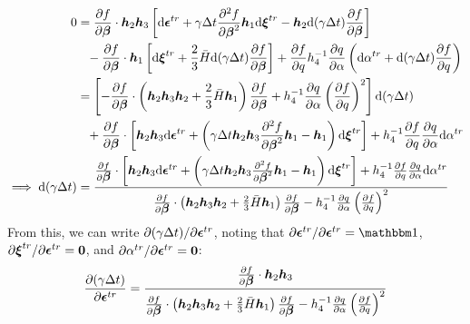 \documentclass[10pt]{article}
\begin{document}
\begin{equation}
\begin{aligned}
0 &=
\frac{\partial f}{\partial \mbox{\boldmath$\beta$}}\cdot
\mbox{\boldmath$ h$}_2
\mbox{\boldmath$ h$}_3
\left[
 \mathrm{d}\mbox{\boldmath$\epsilon$}^{tr}
 +\gamma\Delta t
\frac{\partial^2 f}{\partial \mbox{\boldmath$\beta$}^2}
\mbox{\boldmath$ h$}_1
\mathrm{d}\mbox{\boldmath$\xi$}^{tr} 
- \mbox{\boldmath$ h$}_2
\mathrm{d}(\gamma\Delta t)\frac{\partial f}{\partial\mbox{\boldmath$\beta$}}
\right]\\
&\phantom{=} - \frac{\partial f}{\partial \mbox{\boldmath$\beta$}}\cdot\mbox{\boldmath$ h$}_1
\left[
\mathrm{d}\mbox{\boldmath$\xi$}^{tr} + 
\frac{2}{3}\bar{H}
\mathrm{d}(\gamma\Delta t)\frac{\partial f}{\partial\mbox{\boldmath$\beta$}}
\right]
 + \frac{\partial f}{\partial q}h_4^{-1}
{\frac{\partial q}{\partial \alpha}\left(
\mathrm{d}\alpha^{tr} + \mathrm{d}(\gamma\Delta t)
\frac{\partial f}{\partial q}\right)}\\
&=
\left[
-\frac{\partial f}{\partial \mbox{\boldmath$\beta$}}\cdot
\left(
\mbox{\boldmath$ h$}_2\mbox{\boldmath$ h$}_3\mbox{\boldmath$ h$}_2
 +
\frac{2}{3}\bar{H}\mbox{\boldmath$ h$}_1
\right)
\frac{\partial f}{\partial\mbox{\boldmath$\beta$}}
 + h_4^{-1}
{\frac{\partial q}{\partial \alpha}
\left(\frac{\partial f}{\partial q}\right)^2}
\right]\mathrm{d}(\gamma\Delta t)\\
&\phantom{=}+
\frac{\partial f}{\partial \mbox{\boldmath$\beta$}}\cdot\left[
\mbox{\boldmath$ h$}_2\mbox{\boldmath$ h$}_3
 \mathrm{d}\mbox{\boldmath$\epsilon$}^{tr}
+
\left(\gamma\Delta t\mbox{\boldmath$ h$}_2\mbox{\boldmath$ h$}_3
\frac{\partial^2 f}{\partial \mbox{\boldmath$\beta$}^2}\mbox{\boldmath$ h$}_1 -\mbox{\boldmath$ h$}_1
\right)\mathrm{d}\mbox{\boldmath$\xi$}^{tr} \right]
 +h_4^{-1}\frac{\partial f}{\partial q}
{\frac{\partial q}{\partial \alpha}
\mathrm{d}\alpha^{tr}}\\
\implies \mathrm{d}(\gamma\Delta t) &=
\frac
{\frac{\partial f}{\partial \mbox{\boldmath$\beta$}}\cdot\left[
\mbox{\boldmath$ h$}_2\mbox{\boldmath$ h$}_3
 \mathrm{d}\mbox{\boldmath$\epsilon$}^{tr}
+
\left(\gamma\Delta t\mbox{\boldmath$ h$}_2\mbox{\boldmath$ h$}_3
\frac{\partial^2 f}{\partial \mbox{\boldmath$\beta$}^2}\mbox{\boldmath$ h$}_1 -\mbox{\boldmath$ h$}_1
\right)\mathrm{d}\mbox{\boldmath$\xi$}^{tr} \right]
 +h_4^{-1}\frac{\partial f}{\partial q}
{\frac{\partial q}{\partial \alpha}
\mathrm{d}\alpha^{tr}}}
{\frac{\partial f}{\partial \mbox{\boldmath$\beta$}}\cdot
\left(
\mbox{\boldmath$ h$}_2\mbox{\boldmath$ h$}_3\mbox{\boldmath$ h$}_2
 +
\frac{2}{3}\bar{H}\mbox{\boldmath$ h$}_1
\right)
\frac{\partial f}{\partial\mbox{\boldmath$\beta$}}
 - h_4^{-1}
{\frac{\partial q}{\partial \alpha}
\left(\frac{\partial f}{\partial q}\right)^2}}
\end{aligned}
\end{equation}
From this, we can write $\partial (\gamma\Delta t)/\partial \mbox{\boldmath$\epsilon$}^{tr}$, noting that $\partial \Bepsilon^{tr}/\partial \Bepsilon^{tr} = \iso$, $\partial \mbox{\boldmath$\xi$}^{tr}/\partial \mbox{\boldmath$\epsilon$}^{tr} = \mathbf{0}$, and $\partial \alpha^{tr}/\partial \mbox{\boldmath$\epsilon$}^{tr} = \mathbf{0}$:
\begin{equation}
\frac{\partial (\gamma\Delta t)}{\partial \mbox{\boldmath$\epsilon$}^{tr}} =
\frac
{\frac{\partial f}{\partial \mbox{\boldmath$\beta$}}\cdot
\mbox{\boldmath$ h$}_2\mbox{\boldmath$ h$}_3}
{\frac{\partial f}{\partial \mbox{\boldmath$\beta$}}\cdot
\left(
\mbox{\boldmath$ h$}_2\mbox{\boldmath$ h$}_3\mbox{\boldmath$ h$}_2
 +
\frac{2}{3}\bar{H}\mbox{\boldmath$ h$}_1
\right)
\frac{\partial f}{\partial\mbox{\boldmath$\beta$}}
 - h_4^{-1}
{\frac{\partial q}{\partial \alpha}
\left(\frac{\partial f}{\partial q}\right)^2}}
\end{equation}
\end{document}
